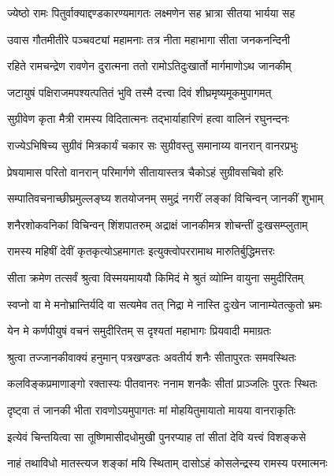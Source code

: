 \twolineshloka
{ज्येष्ठो रामः पितुर्वाक्याद्दण्डकारण्यमागतः}
{लक्ष्मणेन सह भ्रात्रा सीतया भार्यया सह} %

\twolineshloka
{उवास गौतमीतीरे पञ्चवट्यां महामनाः}
{तत्र नीता महाभागा सीता जनकनन्दिनी} %

\twolineshloka
{रहिते रामचन्द्रेण रावणेन दुरात्मना}
{ततो रामोऽतिदुःखार्तो मार्गमाणोऽथ जानकीम्} %

\twolineshloka
{जटायुषं पक्षिराजमपश्यत्पतितं भुवि}
{तस्मै दत्त्वा दिवं शीघ्रमृष्यमूकमुपागमत्} %

\twolineshloka
{सुग्रीवेण कृता मैत्री रामस्य विदितात्मनः}
{तद्भार्याहारिणं हत्वा वालिनं रघुनन्दनः} %

\twolineshloka
{राज्येऽभिषिच्य सुग्रीवं मित्रकार्यं चकार सः}
{सुग्रीवस्तु समानाय्य वानरान् वानरप्रभुः} %

\twolineshloka
{प्रेषयामास परितो वानरान् परिमार्गणे}
{सीतायास्तत्र चैकोऽहं सुग्रीवसचिवो हरिः} %

\twolineshloka
{सम्पातिवचनाच्छीघ्रमुल्लङ्घ्य शतयोजनम्}
{समुद्रं नगरीं लङ्कां विचिन्वन् जानकीं शुभाम्} %

\twolineshloka
{शनैरशोकवनिकां विचिन्वन् शिंशपातरुम्}
{अद्राक्षं जानकीमत्र शोचन्तीं दुःखसम्प्लुताम्} %

\twolineshloka
{रामस्य महिषीं देवीं कृतकृत्योऽहमागतः}
{इत्युक्त्वोपररामाथ मारुतिर्बुद्धिमत्तरः} %

\twolineshloka
{सीता क्रमेण तत्सर्वं श्रुत्वा विस्मयमाययौ}
{किमिदं मे श्रुतं व्योम्नि वायुना समुदीरितम्} %

\twolineshloka
{स्वप्नो वा मे मनोभ्रान्तिर्यदि वा सत्यमेव तत्}
{निद्रा मे नास्ति दुःखेन जानाम्येतत्कुतो भ्रमः} %

\twolineshloka
{येन मे कर्णपीयुषं वचनं समुदीरितम्}
{स दृश्यतां महाभागः प्रियवादी ममाग्रतः} %

\twolineshloka
{श्रुत्वा तज्जानकीवाक्यं हनुमान् पत्रखण्डतः}
{अवतीर्य शनैः सीतापुरतः समवस्थितः} %

\twolineshloka
{कलविङ्कप्रमाणाङ्गो रक्तास्यः पीतवानरः}
{ननाम शनकैः सीतां प्राञ्जलिः पुरतः स्थितः} %

\twolineshloka
{दृष्ट्वा तं जानकी भीता रावणोऽयमुपागतः}
{मां मोहयितुमायातो मायया वानराकृतिः} %

\twolineshloka
{इत्येवं चिन्तयित्वा सा तूष्णिमासीदधोमुखी}
{पुनरप्याह तां सीतां देवि यत्त्वं विशङ्कसे} %

\twolineshloka
{नाहं तथाविधो मातस्त्यज शङ्कां मयि स्थिताम्}
{दासोऽहं कोसलेन्द्रस्य रामस्य परमात्मनः} %


